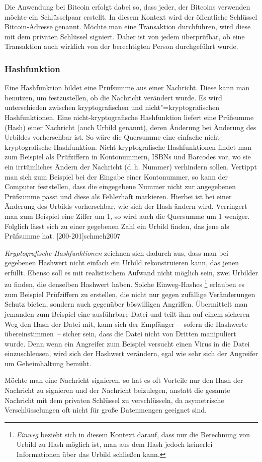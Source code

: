 Die Anwendung bei Bitcoin erfolgt dabei so, dass jeder, der Bitcoins verwenden möchte ein Schlüsselpaar erstellt.
In diesem Kontext wird der öffentliche Schlüssel Bitcoin-Adresse genannt.
Möchte man eine Transaktion durchführen, wird diese mit dem privaten Schlüssel signiert.
Daher ist von jedem überprüfbar, ob eine Transaktion auch wirklich von der berechtigten Person durchgeführt wurde.

\subsubsection{Hashfunktion}

Eine Hashfunktion bildet eine Prüfsumme aus einer Nachricht.
Diese kann man benutzen, um festzustellen, ob die Nachricht verändert wurde.
Es wird unterschieden zwischen kryptografischen und nicht"=kryptografischen Hashfunktionen.
Eine nicht-kryptografische Hashfunktion liefert eine Prüfsumme (Hash) einer Nachricht (auch Urbild genannt), deren Änderung bei Änderung des Urbildes vorhersehbar ist.
So wäre die Quersumme eine einfache nicht-kryptografische Hashfunktion.
Nicht-kryptografische Hashfunktionen findet man zum Beispiel als Prüfziffern in Kontonummern, ISBNs und Barcodes vor, wo sie ein irrtümliches Ändern der Nachricht (d.\,h. Nummer) verhindern sollen.
Vertippt man sich zum Beispiel bei der Eingabe einer Kontonummer, so kann der Computer feststellen, dass die eingegebene Nummer nicht zur angegebenen Prüfsumme passt und diese als Fehlerhaft markieren.
Hierbei ist bei einer Änderung des Urbilds vorhersehbar, wie sich der Hash ändern wird.
Verringert man zum Beispiel eine Ziffer um 1, so wird auch die Quersumme um 1 weniger.
Folglich lässt sich zu einer gegebenen Zahl ein Urbild finden, das jene als Prüfsumme hat.
[200-201]{schmeh2007}

\emph{Kryptografische Hashfunktionen} zeichnen sich dadurch aus, dass man bei gegebenen Hashwert nicht einfach ein Urbild rekonstruieren kann, das jenen erfüllt.
Ebenso soll es mit realistischem Aufwand nicht möglich sein, zwei Urbilder zu finden, die denselben Hashwert haben.
Solche Einweg-Hashes%
\footnote{\emph{Einweg} bezieht sich in diesem Kontext darauf, dass nur die Berechnung von Urbild zu Hash möglich ist, man aus dem Hash jedoch keinerlei Informationen über das Urbild schließen kann.}
erlauben es zum Beispiel Prüfziffern zu erstellen, die nicht nur gegen zufällige Veränderungen Schutz bieten, sondern auch gegenüber böswilligen Angriffen.
Übermittelt man jemanden zum Beispiel eine ausführbare Datei und teilt ihm auf einem sicheren Weg den Hash der Datei mit, kann sich der Empfänger --~sofern die Hashwerte übereinstimmen~-- sicher sein, dass die Datei nicht von Dritten manipuliert wurde.
Denn wenn ein Angreifer zum Beispiel versucht einen Virus in die Datei einzuschleusen, wird sich der Hashwert verändern, egal wie sehr sich der Angreifer um Geheimhaltung bemüht.

Möchte man eine Nachricht signieren, so hat es oft Vorteile nur den Hash der Nachricht zu signieren und der Nachricht beizulegen, anstatt die gesamte Nachricht mit dem privaten Schlüssel zu verschlüsseln, da asymetrische Verschlüsselungen oft nicht für große Datenmengen geeignet sind.
